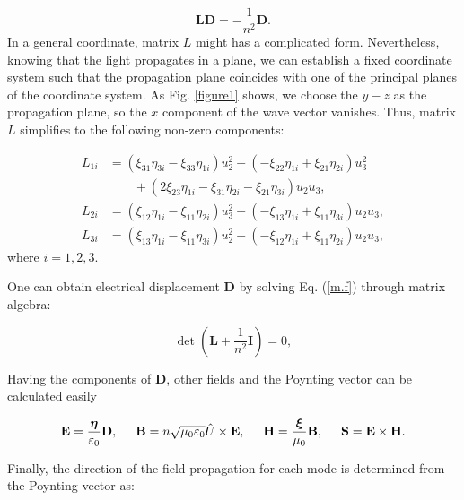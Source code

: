 \documentclass[9pt,twocolumn,twoside]{osajnl}
\begin{document}
\begin{equation}\label{m.f}
\mathbf{L}\mathbf{D}=-\frac{1}{n^{2}}\mathbf{D}.        
\end{equation}
In a general coordinate, matrix  $L$ might has a complicated form. Nevertheless, knowing that the light propagates in a plane, we can establish a fixed coordinate system such that the propagation plane coincides with one of the principal planes of the coordinate system. As  Fig. \ref{figure1} shows, we choose the $y-z$ as the propagation plane, so the $x$ component of  the wave vector vanishes.  Thus,  matrix $L$ simplifies to the following non-zero components:

\begin{align}
L_{1i} &= (\xi_{31}\eta_{3i}-\xi_{33}\eta_{1i})u^{2}_{2} +(-\xi_{22}\eta_{1i}+\xi_{21}\eta_{2i})u^{2}_{3}\nonumber\\
&\qquad +(2\xi_{23}\eta_{1i}-\xi_{31}\eta_{2i}-\xi_{21}\eta_{3i})u_{2}u_{3},\nonumber\\
L_{2i} &=(\xi_{12}\eta_{1i}-\xi_{11}\eta_{2i})u^{2}_{3}+(-\xi_{13}\eta_{1i}+\xi_{11}\eta_{3i})u_{2}u_{3}, \nonumber \\
L_{3i} &=(\xi_{13}\eta_{1i}-\xi_{11}\eta_{3i})u^{2}_{2}+(-\xi_{12}\eta_{1i}+\xi_{11}\eta_{2i})u_{2}u_{3},
 \end{align}
where $i=1,2,3$.

One can obtain electrical displacement $\mathbf{D}$  by solving  Eq. (\ref{m.f}) through matrix algebra:


\begin{equation}\label{det}
    \det(\mathbf{L}+\frac{1}{n^{2}}\mathbf{I})=0,
\end{equation}

Having the components of  $\mathbf{D}$, other fields and the Poynting vector can be calculated easily  \cite{jackson1962classical}

\begin{equation}\label{e.h}
\mathbf{E}=\frac{\boldsymbol\eta}{\varepsilon_{0}}\mathbf{D}, \hspace{.5cm}  \mathbf{B}=n\sqrt{\mu_{0}\varepsilon_{0}}  \hat{U}\times{\mathbf{E}}, \hspace{.5cm}\mathbf{H}=\frac{\boldsymbol\xi}{\mu_{0}}\mathbf{B},
\hspace{.5cm}\mathbf{S}=  \mathbf{E}\times \mathbf{H}.
\end{equation}

Finally, the direction of the field propagation for each mode is determined from the Poynting vector as: 
\end{document}

